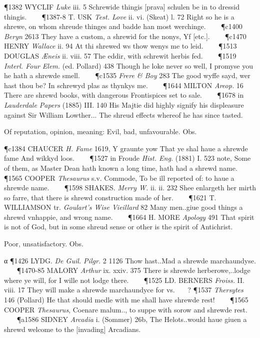 \begin{description}[wide, labelwidth=!, labelindent=0pt]
\begin{myenumerate}
\P 1382 WYCLIF  \textit{Luke} iii. 5 Schrewide thingis [prava] schulen be in to dressid thingis.    
\P 1387-8 T. USK  \textit{Test. Love} ii. vi. (Skeat) l. 72 Right so he is a shrewe, on whom shreude thinges and badde han most werchinge.    
\P c1400  \textit{Beryn} 2613 They have a custom, a shrewid for the nonys, Yf [etc.].    
\P c1470 HENRY  \textit{Wallace} ii. 94 At thi shrewed ws thow wenys me to leid.    
\P 1513 DOUGLAS  \textit{Æneis} ii. viii. 57 The eddir, with schrewit herbis fed.    
\P 1519 \textit{Interl.  Four Elem.} (ed. Pollard) 438 Though he loke never so well, I promyse you he hath a shrewde smell.    
\P c1535 \textit{Frere \& Boy}  283 The good wyffe sayd, wer hast thou be? In schrewyd plas as thynkys me.    
\P 1644 MILTON  \textit{Areop.} 16 There are shrewd books, with dangerous Frontispices set to sale.    
\P 1678 in  \textit{Lauderdale Papers} (1885) III. 140 His Majtie did highly signify his displeasure against Sir William Lowther... The shreud effects whereof he has since tasted.

 Of reputation, opinion, meaning: Evil, bad, unfavourable. Obs.

\P c1384 CHAUCER  \textit{H. Fame} 1619, Y graunte yow That ye shal haue a shrewde fame And wikkyd loos.    
\P 1527 in  Froude \textit{Hist. Eng.} (1881) I. 523 note, Some of them, as Master Dean hath known a long time, hath had a shrewd name.    
\P 1565 COOPER  \textit{Thesaurus} s.v. Commode, To be ill reported of: to haue a shrewde name.    
\P 1598 SHAKES.  \textit{Merry W.} ii. ii. 232 Shee enlargeth her mirth so farre, that there is shrewd construction made of her.    
\P 1621 T. WILLIAMSON tr.  \textit{Goulart's Wise Vieillard} 82 Many men..giue good things a shrewd vnhappie, and wrong name.    
\P 1664 H. MORE  \textit{Apology} 491 That spirit is not of God, but in some shreud sense or other is the spirit of Antichrist.

 Poor, unsatisfactory. Obs.

α \P 1426 LYDG.  \textit{De Guil. Pilgr.} 2 1126 Thow  hast..Mad a shrewde marchaundyse.    
\P 1470-85 MALORY  \textit{Arthur} ix. xxiv. 375 There is shrewde herberowe,..lodge where ye will, for I wille not lodge there.    
\P 1525 LD. BERNERS  \textit{Froiss.} II. viii. 17 They will make a shrewde marchaundyce for vs.    ?
\P 1537 \textit{Thersytes}  146 (Pollard) He that should medle with me shall have shrewde rest!    
\P 1565 COOPER  \textit{Thesaurus}, Coenare malum.., to suppe with sorow and shrewde rest.    
\P a1586 SIDNEY  \textit{Arcadia} i. (Sommer) 26b, The Helots..would haue giuen a shrewd welcome to the [invading] Arcadians.


\end{myenumerate}
\end{description}
